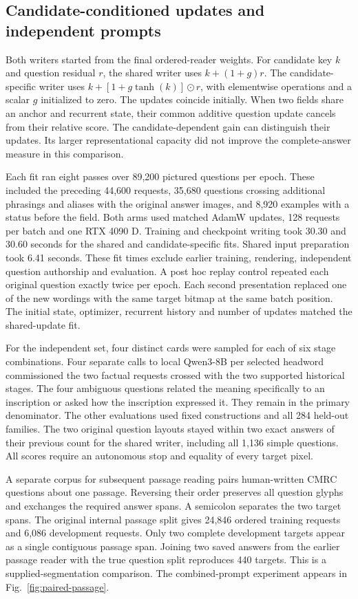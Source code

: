 \subsection*{Candidate-conditioned updates and independent prompts}
Both writers started from the final ordered-reader weights. For candidate key $k$ and question residual $r$, the shared writer uses $k+(1+g)r$. The candidate-specific writer uses $k+[1+g\tanh(k)]\odot r$, with elementwise operations and a scalar $g$ initialized to zero. The updates coincide initially. When two fields share an anchor and recurrent state, their common additive question update cancels from their relative score. The candidate-dependent gain can distinguish their updates. Its larger representational capacity did not improve the complete-answer measure in this comparison.

Each fit ran eight passes over 89,200 pictured questions per epoch. These included the preceding 44,600 requests, 35,680 questions crossing additional phrasings and aliases with the original answer images, and 8,920 examples with a status before the field. Both arms used matched AdamW updates, 128 requests per batch and one RTX 4090 D. Training and checkpoint writing took 30.30 and 30.60 seconds for the shared and candidate-specific fits. Shared input preparation took 6.41 seconds. These fit times exclude earlier training, rendering, independent question authorship and evaluation. A post hoc replay control repeated each original question exactly twice per epoch. Each second presentation replaced one of the new wordings with the same target bitmap at the same batch position. The initial state, optimizer, recurrent history and number of updates matched the shared-update fit.

For the independent set, four distinct cards were sampled for each of six stage combinations. Four separate calls to local Qwen3-8B per selected headword commissioned the two factual requests crossed with the two supported historical stages. The four ambiguous questions related the meaning specifically to an inscription or asked how the inscription expressed it. They remain in the primary denominator. The other evaluations used fixed constructions and all 284 held-out families. The two original question layouts stayed within two exact answers of their previous count for the shared writer, including all 1,136 simple questions. All scores require an autonomous stop and equality of every target pixel.

A separate corpus for subsequent passage reading pairs human-written CMRC questions about one passage. Reversing their order preserves all question glyphs and exchanges the required answer spans. A semicolon separates the two target spans. The original internal passage split gives 24,846 ordered training requests and 6,086 development requests. Only two complete development targets appear as a single contiguous passage span. Joining two saved answers from the earlier passage reader with the true question split reproduces 440 targets. This is a supplied-segmentation comparison. The combined-prompt experiment appears in Fig.~\ref{fig:paired-passage}.
